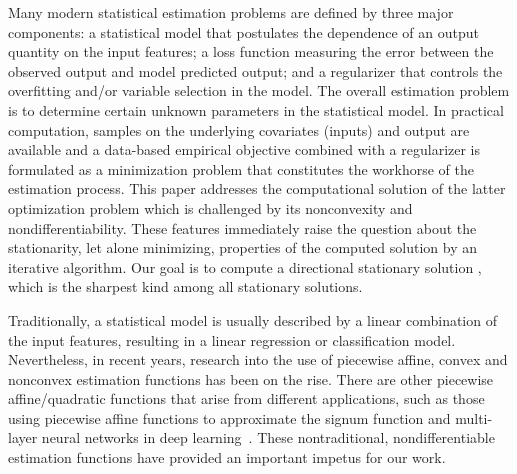 \documentclass{siamart}
\begin{document}
Many modern statistical estimation problems are defined by three major components:
a statistical model that postulates the dependence of an output quantity on the input features; a loss function measuring the error between the observed output and model predicted output;
and a regularizer that controls the overfitting and/or variable selection in the model.
The overall estimation problem is to determine certain unknown parameters in the statistical
model. %
In practical computation, samples on the underlying covariates (inputs) and output are available
and a data-based empirical objective combined with a regularizer is formulated as a minimization
problem that constitutes the workhorse of the
estimation process.  This paper addresses the computational solution of the latter optimization
problem which is challenged by its nonconvexity and nondifferentiability.    These features
immediately raise the question about the stationarity, let alone minimizing, properties of
the computed solution by an iterative algorithm.  Our goal is to compute a directional stationary
solution \cite{PangRazaviyaynAlvarado16}, which is the sharpest kind among all stationary solutions.

Traditionally, a statistical model is usually described by a linear combination of the input features,
resulting in a linear regression or classification model.  Nevertheless, in recent years,
research into the use of piecewise affine, convex \cite{HannahDunson11,HannahDunson13,MCISen15}
and nonconvex \cite{HahnBanergjeeSen16} estimation functions has been on the rise.  There are other
piecewise affine/quadratic functions that arise from different applications, such as those using piecewise affine functions to approximate the signum function and multi-layer neural networks in deep learning~\cite[Chapter~4]{YuDeng15}.  These
nontraditional, nondifferentiable estimation functions have provided an important impetus for our work.
\end{document}
